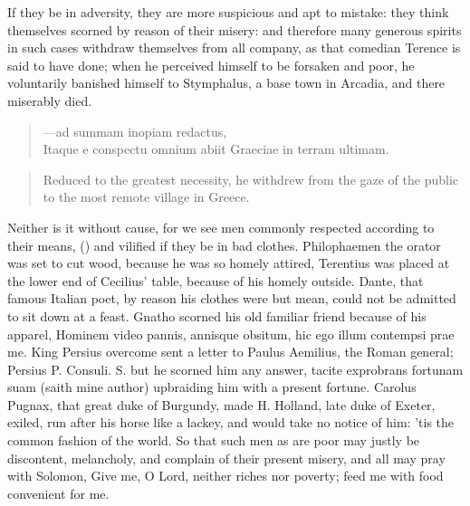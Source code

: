 {If they be in adversity, they are more suspicious and apt to mistake:
they think themselves scorned by reason of their misery: and therefore
many generous spirits in such cases withdraw themselves from all
company, as that comedian Terence is said to have done; when he
perceived himself to be forsaken and poor, he voluntarily banished
himself to Stymphalus, a base town in Arcadia, and there miserably
died.
%
\begin{latin}
\begin{quote}
---ad summam inopiam redactus,\\
Itaque e conspectu omnium abiit Graeciae in terram ultimam.
\end{quote}
\end{latin}
\translationrule
\begin{quote}%
Reduced to the greatest necessity, he withdrew from the gaze of the public to the most remote village in Greece.
\end{quote}
%
Neither is it without cause, for we see men commonly respected
according to their means, () and vilified if they be in bad clothes. Philophaemen the
orator was set to cut wood, because he was so homely attired,
Terentius was placed at the lower end of Cecilius' table, because
of his homely outside.  Dante, that famous Italian poet, by
reason his clothes were but mean, could not be admitted to sit down at
a feast. Gnatho scorned his old familiar friend because of his apparel,
Hominem video pannis, annisque obsitum, hic ego illum contempsi
prae me. King Persius overcome sent a letter to Paulus Aemilius,
the Roman general; Persius P. Consuli. S. but he scorned him any
answer, tacite exprobrans fortunam suam (saith mine author) upbraiding
him with a present fortune. Carolus Pugnax, that great duke of
Burgundy, made H. Holland, late duke of Exeter, exiled, run after his
horse like a lackey, and would take no notice of him:  'tis the
common fashion of the world. So that such men as are poor may justly be
discontent, melancholy, and complain of their present misery, and all
may pray with Solomon, Give me, O Lord, neither riches nor
poverty; feed me with food convenient for me.

}
